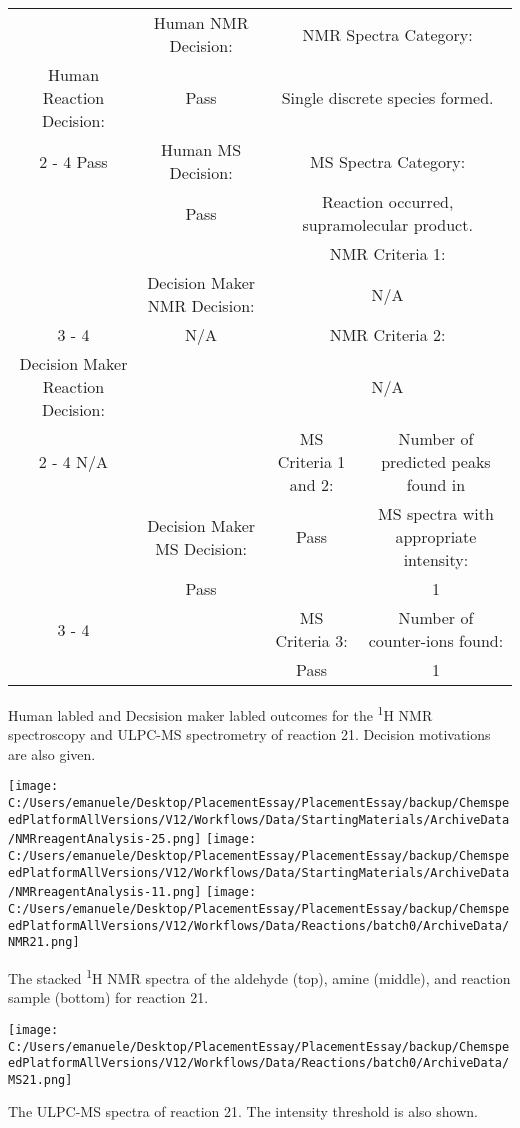 \documentclass{article}%
\begin{document}
\begin{Decision Table}[H]%
\begin{tabular}{|c|c|c|c|}%
\hline%
&Human NMR Decision:&\multicolumn{2}{|c|}{NMR Spectra Category:}\\%
Human Reaction Decision:&Pass&\multicolumn{2}{|c|}{Single discrete species formed.}\\%
\cline{2%
-%
4}%
Pass&Human MS Decision:&\multicolumn{2}{|c|}{MS Spectra Category:}\\%
&Pass&\multicolumn{2}{|c|}{Reaction occurred, supramolecular product.}\\%
\hline%
&&\multicolumn{2}{|c|}{NMR Criteria 1:}\\%
&Decision Maker NMR Decision:&\multicolumn{2}{|c|}{N/A}\\%
\cline{3%
-%
4}%
&N/A&\multicolumn{2}{|c|}{NMR Criteria 2:}\\%
Decision Maker Reaction Decision:&&\multicolumn{2}{|c|}{N/A}\\%
\cline{2%
-%
4}%
N/A&&MS Criteria 1 and 2:&Number of predicted peaks found in\\%
&Decision Maker MS Decision:&Pass&MS spectra with appropriate intensity:\\%
&Pass&&1\\%
\cline{3%
-%
4}%
&&MS Criteria 3:&Number of counter{-}ions found:\\%
&&Pass&1\\%
\hline%
\end{tabular}%
\caption{Human labled and Decsision maker labled outcomes for the \textsuperscript{1}H NMR spectroscopy and ULPC-MS spectrometry of reaction 21. Decision motivations are also given.}%
\end{Decision Table}%
\begin{NMR Spectra}[H]%
\begin{center}%
\texttt{[image: C:/Users/emanuele/Desktop/PlacementEssay/PlacementEssay/backup/ChemspeedPlatformAllVersions/V12/Workflows/Data/StartingMaterials/ArchiveData/NMRreagentAnalysis-25.png]}\hfill%
\texttt{[image: C:/Users/emanuele/Desktop/PlacementEssay/PlacementEssay/backup/ChemspeedPlatformAllVersions/V12/Workflows/Data/StartingMaterials/ArchiveData/NMRreagentAnalysis-11.png]}\hfill%
\texttt{[image: C:/Users/emanuele/Desktop/PlacementEssay/PlacementEssay/backup/ChemspeedPlatformAllVersions/V12/Workflows/Data/Reactions/batch0/ArchiveData/NMR21.png]}\hfill%
\end{center}%
\caption{The stacked \textsuperscript{1}H NMR spectra of the aldehyde (top), amine (middle), and reaction sample (bottom) for reaction 21.}%
\end{NMR Spectra}%
\begin{MS Spectra}[H]%
\begin{center}%
\texttt{[image: C:/Users/emanuele/Desktop/PlacementEssay/PlacementEssay/backup/ChemspeedPlatformAllVersions/V12/Workflows/Data/Reactions/batch0/ArchiveData/MS21.png]}\hfill%
\end{center}%
\caption{The ULPC-MS spectra of reaction 21. The intensity threshold is also shown.}%
\end{MS Spectra}%
\end{document}
